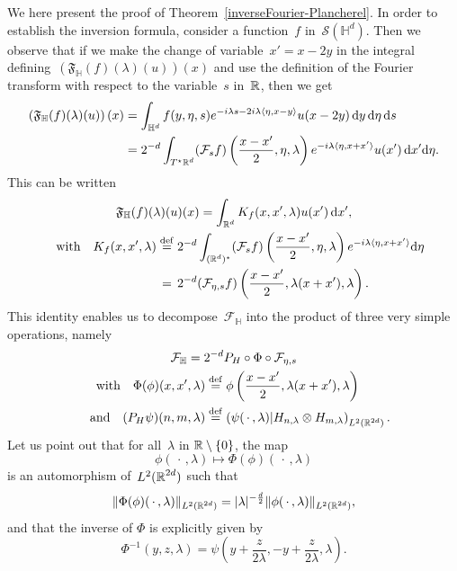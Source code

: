 \documentclass[AHL,Unicode,longabstracts]{cedram}
\def\R{{\mathop{\mathbb R\kern 0pt}\nolimits}}
\newcommand*\bbH{\mathbb{H}}
\newcommand{\lam}{\lambda}
\newcommand*\cF{\mathcal{F}}
\newcommand*\cS{\mathcal{S}}
\newcommand*\fF{\mathfrak{F}}
\newcommand*\R{\mathbb{R}}
\newcommand*\bbH{\mathbb{H}}
\newcommand{\andf}{\quad\hbox{and}\quad}
\newcommand{\with}{\quad\hbox{with}\quad}
\newcommand*\eqdefa{\overset{\mathrm{def}}{=}}
\newcommand*\peqdefa{\overset{\phantom{\mathrm{def}}}{=}}
\newcommand*{\dd}{\mathrm{d}}
\newcommand{\ds}{\dd s}
\newcommand{\dx}{\dd x}
\newcommand{\dy}{\dd y}
\newcommand{\deta}{\dd \eta}
\renewcommand*{\cdotp}{.}
\begin{document}
We here present the proof of Theorem~\ref{inverseFourier-Plancherel}. In order to establish the inversion formula, consider a function~$f$ in~$\cS(\bbH^d)$. Then we observe that if we make the change of variable~$x'= x-2y$ in the integral defining~$(\fF_{\bbH}(f)(\lam)(u))(x)$ and use the definition of the Fourier transform with respect to the variable~$s$ in~$\R$, then we get
\begin{equation}
\begin{aligned}\label{formulaFourerHbis-1}
\left(\fF_{\bbH}(f)(\lam)(u)\right)(x) &=
\int_{\bbH^d} f(y,\eta,s) e^{-i\lam s -2i\lam \langle \eta, x-y\rangle} u(x-2y)\,\dy\,\deta\, \ds\\
&= 2^{-d}\int_{T^\star \R^d} (\cF_s f)\left(\frac {x-x'} 2,\eta, \lam\right) e^{-i\lam \langle \eta, x+x'\rangle} u(x') \,\dx'\deta.
\end{aligned}
\end{equation}
This can be written
\begin{equation}\label{formulaFourerHbis}
\begin{gathered}
\fF_{\bbH}(f)(\lam) (u)(x) = \int_{\R^d} K_f(x,x',\lam) u(x')\, \dx',\\
\begin{aligned}
\with K_f(x,x',\lam) &\eqdefa 2^{-d} \int_{(\R^d)^\star } (\cF_s f)\left(\frac {x-x'} 2,\eta, \lam\right) e^{-i\lam \langle \eta, x+x'\rangle} \deta\\
&\peqdefa 2^{-d} (\cF_{\eta,s} f)\left(\frac {x-x'} 2,\lam(x+x'), \lam\right).
\end{aligned}
\end{gathered}
\end{equation}
This identity enables us to decompose~$\cF_\bbH$ into the product of three very simple operations, namely
\begin{equation}\label{decomF_H}
\begin{gathered}
\cF_\bbH = 2^{-d}P_H \circ \Phi\circ \cF_{\eta,s}\\
\begin{aligned}
\with \Phi(\phi)(x,x',\lam) & \eqdefa \phi \left(\frac {x-x'} 2,\lam(x+x'), \lam\right)\\
\andf (P_H\psi)(n,m,\lam) & \eqdefa \left(\psi({\,\cdot\,},\lam)| H_{n,\lam} \otimes H_{m,\lam}\right)_{L^2(\R^{2d})}.
\end{aligned}
\end{gathered}
\end{equation}
Let us point out that for all~$\lam$ in $\R\setminus\{0\}$, the map
\[
\phi({\,\cdot\,},\lam) \longmapsto \Phi(\phi)({\,\cdot\,}, \lam)
\]
is an automorphism of~$L^2(\R^{2d})$ such that
\begin{equation}\label{inverseFourierL2demoeq1}
\|\Phi(\phi) ({\,\cdot\,},\lam)\|_{L^2(\R^{2d})} =|\lam|^{- \frac d 2} \|\phi({\,\cdot\,},\lam)\|_{L^2(\R^{2d})},
\end{equation}
and that the inverse of $\Phi$ is explicitly given by
\begin{equation}\label{inverseFourierL2demoeq2}
\Phi^{-1} (y,z,\lam)= \psi \left (y+\frac z {2\lam}, -y+\frac z {2\lam}, \lam \right)\cdotp
\end{equation}
\end{document}
